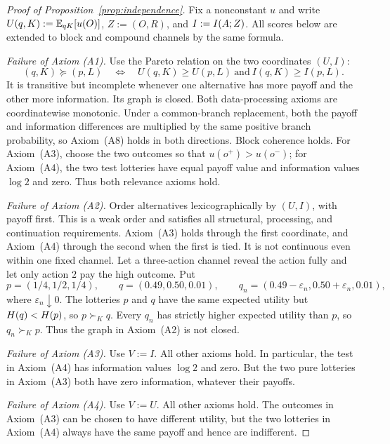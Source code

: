 \begin{proof}[Proof of Proposition~\ref{prop:independence}]
Fix a nonconstant $u$ and write $U(q,K):=\mathbb E_{qK}[u(O)]$, $Z:=(O,R)$, and $I:=I(A;Z)$.  All scores below are
extended to block and compound channels by the same formula.

\emph{Failure of Axiom \textup{(A1)}.}
Use the Pareto relation on the two coordinates $(U,I)$:
\[
 (q,K)\succeq(p,L)
 \quad\Longleftrightarrow\quad
 U(q,K)\ge U(p,L)\ \text{and}\ I(q,K)\ge I(p,L).
\]
It is transitive but incomplete whenever one alternative has more payoff and the other more information.  Its graph is
closed.  Both data-processing axioms are coordinatewise monotonic.  Under a common-branch replacement, both the
payoff and information differences are multiplied by the same positive branch probability, so Axiom~\textup{(A8)}
holds in both directions.  Block coherence holds.  For Axiom~\textup{(A3)}, choose the two outcomes so that
$u(o^+)>u(o^-)$; for Axiom~\textup{(A4)}, the two test lotteries have equal payoff value and information values
$\log2$ and zero.  Thus both relevance axioms hold.

\emph{Failure of Axiom \textup{(A2)}.}
Order alternatives lexicographically by $(U,I)$, with payoff first.  This is a weak order and satisfies all structural,
processing, and continuation requirements.  Axiom~\textup{(A3)} holds through the first coordinate, and
Axiom~\textup{(A4)} through the second when the first is tied.  It is not continuous even within one fixed channel.  Let a
three-action channel reveal the action fully and let only action $2$ pay the high outcome.  Put
\[
 p=(1/4,1/2,1/4),\qquad q=(0.49,0.50,0.01),\qquad
 q_n=(0.49-\varepsilon_n,0.50+\varepsilon_n,0.01),
\]
where $\varepsilon_n\downarrow0$.  The lotteries $p$ and $q$ have the same expected utility but
$H(q)<H(p)$, so $p\succ_Kq$.  Every $q_n$ has strictly higher expected utility than $p$, so
$q_n\succ_Kp$.  Thus the graph in Axiom~\textup{(A2)} is not closed.

\emph{Failure of Axiom \textup{(A3)}.}
Use $V:=I$.  All other axioms hold.  In particular, the test in
Axiom~\textup{(A4)} has information values $\log2$ and zero.  But the two pure
lotteries in Axiom~\textup{(A3)} both have zero information, whatever their payoffs.

\emph{Failure of Axiom \textup{(A4)}.}
Use $V:=U$.  All other axioms hold.  The outcomes in Axiom~\textup{(A3)} can be
chosen to have different utility, but the two lotteries in Axiom~\textup{(A4)}
always have the same payoff and hence are indifferent.


\end{proof}
